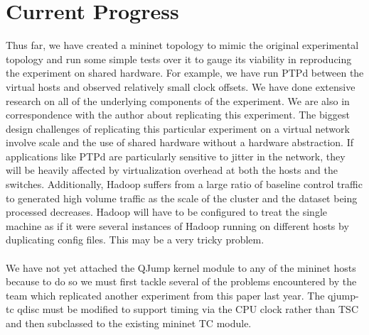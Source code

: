 \documentclass[12pt]{article}
\begin{document}
\section*{Current Progress}
	Thus far, we have created a mininet topology to mimic the original experimental topology and run some simple tests over it to gauge its viability in reproducing the experiment on shared hardware. For example, we have run PTPd between the virtual hosts and observed relatively small clock offsets. We have done extensive research on all of the underlying components of the experiment. We are also in correspondence with the author about replicating this experiment. The biggest design challenges of replicating this particular experiment on a virtual network involve scale and the use of shared hardware without a hardware abstraction. If applications like PTPd are particularly sensitive to jitter in the network, they will be heavily affected by virtualization overhead at both the hosts and the switches. Additionally, Hadoop suffers from a large ratio of baseline control traffic to generated high volume traffic as the scale of the cluster and the dataset being processed decreases. Hadoop will have to be configured to treat the single machine as if it were several instances of Hadoop running on different hosts by duplicating config files. This may be a very tricky problem.\\
	\\	
	 We have not yet attached the QJump kernel module to any of the mininet hosts because to do so we must first tackle several of the problems encountered by the team which replicated another experiment from this paper last year. The qjump-tc qdisc must be modified to support timing via the CPU clock rather than TSC and then subclassed to the existing mininet TC module.
	 
\end{document}

